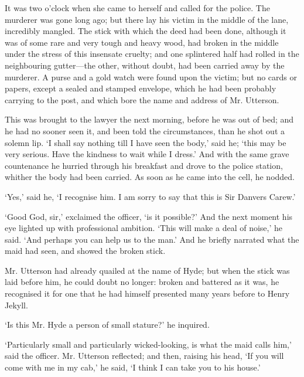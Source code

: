 \documentclass[]{novel}
\begin{document}
It was two o’clock when she came to herself and called for the police. The murderer was gone long ago; but there lay his victim in the middle of the lane, incredibly mangled. The stick with which the deed had been done, although it was of some rare and very tough and heavy wood, had broken in the middle under the stress of this insensate cruelty; and one splintered half had rolled in the neighbouring gutter—the other, without doubt, had been carried away by the murderer. A purse and a gold watch were found upon the victim; but no cards or papers, except a sealed and stamped envelope, which he had been probably carrying to the post, and which bore the name and address of Mr. Utterson.

This was brought to the lawyer the next morning, before he was out of bed; and he had no sooner seen it, and been told the circumstances, than he shot out a solemn lip. ‘I shall say nothing till I have seen the body,’ said he; ‘this may be very serious. Have the kindness to wait while I dress.’ And with the same grave countenance he hurried through his breakfast and drove to the police station, whither the body had been carried. As soon as he came into the cell, he nodded.

‘Yes,’ said he, ‘I recognise him. I am sorry to say that this is Sir Danvers Carew.’

‘Good God, sir,’ exclaimed the officer, ‘is it possible?’ And the next moment his eye lighted up with professional ambition. ‘This will make a deal of noise,’ he said. ‘And perhaps you can help us to the man.’ And he briefly narrated what the maid had seen, and showed the broken stick.

Mr. Utterson had already quailed at the name of Hyde; but when the stick was laid before him, he could doubt no longer: broken and battered as it was, he recognised it for one that he had himself presented many years before to Henry Jekyll.

‘Is this Mr. Hyde a person of small stature?’ he inquired.

‘Particularly small and particularly wicked-looking, is what the maid calls him,’ said the officer.
Mr. Utterson reflected; and then, raising his head, ‘If you will come with me in my cab,’ he said, ‘I think I can take you to his house.’
\end{document}
